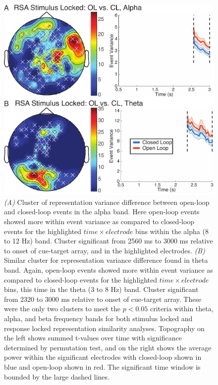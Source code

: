 \documentclass[11pt, titlepage, twoside]{article}
\begin{document}
\begin{figure}
	\begin{center}
		\includegraphics[width=.9\textwidth]{figs/deevVarClusters_edit.pdf}
	\end{center}
	\caption[Representation Dissimilarity EEG Clusters]{
		\emph{(A)} Cluster of representation variance difference between open-loop and closed-loop events in the alpha band.  Here open-loop events showed more within event variance as compared to closed-loop events for the highlighted $time \times electrode$ bins within the alpha (8 to 12 Hz) band.  Cluster significant from 2560 ms to 3000 ms relative to onset of cue-target array, and in the highlighted electrodes.
		\emph{(B)} Similar cluster for representation variance difference found in theta band.  Again, open-loop events showed more within event variance as compared to closed-loop events for the highlighted $time \times electrode$ bins, this time in the theta (3 to 8 Hz) band.  Cluster significant from 2320 to 3000 ms relative to onset of cue-target array.  These were the only two clusters to meet the $p<0.05$ criteria within theta, alpha, and beta frequency bands for both stimulus locked and response locked representation similarity analyses.   Topography on the left shows summed t-values over time with significance determined by permutation test, and on the right shows the average power within the significant electrodes with closed-loop shown in blue and open-loop shown in red.  The significant time window is bounded by the large dashed lines.
	}
	\label{fig:deevVarClusters}
\end{figure}
\end{document}
